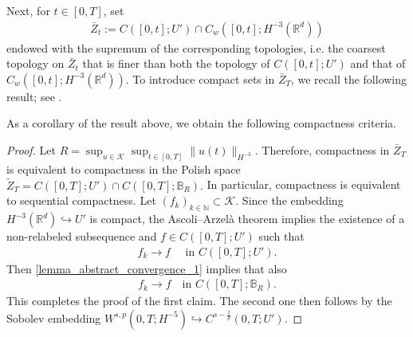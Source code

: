 \documentclass[a4paper,10pt]{amsart}
\newcommand{\N}{\mathbb{N}}
\newcommand{\R}{\mathbb{R}}
\newcommand{\norm}[1]{\left\|#1\right\|}
\newtheorem{corollary}[theorem]{Corollary}
\newtheorem{lemma}[theorem]{Lemma}
\theoremstyle{remark}
\numberwithin{equation}{section}
\begin{document}
Next, for $t\in [0,T]$, set \begin{align}\label{topology_fluctuations}
    \bar{Z}_t:=C([0,t];U')\cap C_w([0,t];H^{-3}(\R^d))
\end{align}
endowed with the supremum of the corresponding topologies, i.e. the coarsest topology on $\bar{Z}_t$ that is finer than both the topology of $C([0,t];U')$ and that of $C_w([0,t];H^{-3}(\R^d)).$
To introduce compact sets in $\bar{Z}_T$, we recall the following result;
see \cite[Lemma 2.1]{brzezniak2014existence}.
As a corollary of the result above, we obtain the following compactness criteria.
\begin{proof}
Let $R=\sup_{u\in \mathcal{K}}\sup_{t\in [0,T]}\|u(t)\|_{H^{-3}}.$
Therefore, compactness in $\bar{Z}_T$ is equivalent to compactness in the
Polish space
$\tilde{Z}_T=C([0,T];U')\cap C([0,T];\mathbb{B}_R).$
In particular, compactness is equivalent to sequential compactness. Let
$(f_k)_{k\in \N}\subset \mathcal{K}$. Since the embedding
$H^{-3}(\R^d)\hookrightarrow U'$ is compact, the Ascoli--Arzelà theorem implies
the existence of a non-relabeled subsequence and
$f\in C([0,T];U')$ such that
\begin{align*}
 f_k\rightarrow f\quad \mbox{ in }   C([0,T];U').
\end{align*}
Then \cref{lemma_abstract_convergence_1} implies that also 
\begin{align*}
    f_k\rightarrow f\quad \text{in }C([0,T];\mathbb{B}_R).
\end{align*}
This completes the proof of the first claim. The second one then follows by
the Sobolev embedding
$W^{s,p}(0,T;H^{-5})\hookrightarrow C^{s-\frac1p}(0,T;U')$.
\end{proof}
\end{document}
